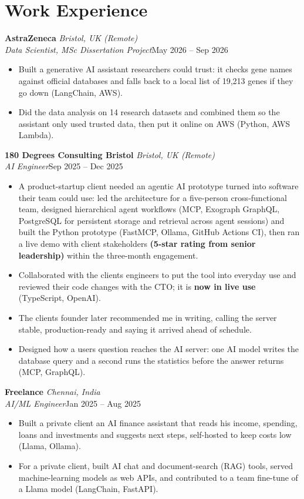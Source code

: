 \documentclass[a4paper,11pt]{article}
\newcommand{\role}[4]{%
  \textbf{#1}{\color{muted}\,\textperiodcentered\,\textit{#2}}\\
  \textit{#4}\hfill{\color{muted}#3}\par}
\newcommand{\gap}{\vspace{5pt}}
\newcommand{\num}[1]{\textbf{#1}}   %
\begin{document}
\section{Work Experience}
\role{AstraZeneca}{Bristol, UK (Remote)}{May 2026 – Sep 2026}{Data Scientist, MSc Dissertation Project}
\begin{itemize}
  \item Built a generative AI assistant researchers could trust: it checks gene names against official databases and falls back to a local list of 19,213 genes if they go down (LangChain, AWS).
  \item Did the data analysis on 14 research datasets and combined them so the assistant only used trusted data, then put it online on AWS (Python, AWS Lambda).
\end{itemize}
\gap
{}
\role{180 Degrees Consulting Bristol}{Bristol, UK (Remote)}{Sep 2025 – Dec 2025}{AI Engineer}
\begin{itemize}
  \item A product-startup client needed an agentic AI prototype turned into software their team could use: led the architecture for a five-person cross-functional team, designed hierarchical agent workflows (MCP, Exograph GraphQL, PostgreSQL for persistent storage and retrieval across agent sessions) and built the Python prototype (FastMCP, Ollama, GitHub Actions CI), then ran a live demo with client stakeholders \num{(5-star rating from senior leadership)} within the three-month engagement.
  \item Collaborated with the client\textquotesingle{}s engineers to put the tool into everyday use and reviewed their code changes with the CTO; it is \num{now in live use} (TypeScript, OpenAI).
  \item The client\textquotesingle{}s founder later recommended me in writing, calling the server \textquotesingle{}stable, production-ready\textquotesingle{} and saying it arrived ahead of schedule.
  \item Designed how a user\textquotesingle{}s question reaches the AI server: one AI model writes the database query and a second runs the statistics before the answer returns (MCP, GraphQL).
\end{itemize}
\gap
{}
\role{Freelance}{Chennai, India}{Jan 2025 – Aug 2025}{AI/ML Engineer}
\begin{itemize}
  \item Built a private client an AI finance assistant that reads his income, spending, loans and investments and suggests next steps, self-hosted to keep costs low (Llama, Ollama).
  \item For a private client, built AI chat and document-search (RAG) tools, served machine-learning models as web APIs, and contributed to a team fine-tune of a Llama model (LangChain, FastAPI).
\end{itemize}
\end{document}
